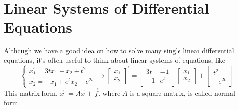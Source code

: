 \chapter{Linear Systems of Differential Equations}
Although we have a good idea on how to solve many single linear differential equations, it's often useful to think about linear systems of equations, like
\begin{equation*}
	\begin{cases}
		x_1^\prime = 3tx_1 - x_2 + t^2 \\
		x_2^\prime = -x_1 + e^tx_2 - e^{2t}
	\end{cases}
	\to
	\begin{bmatrix}
		x_1 \\ 
		x_2
	\end{bmatrix}^\prime = \begin{bmatrix}
		3t & -1 \\
		-1 & e^t
	\end{bmatrix} \begin{bmatrix}
		x_1 \\
		x_2
	\end{bmatrix} + \begin{bmatrix}
		t^2 \\
		-e^{2t}
	\end{bmatrix}
\end{equation*}
This matrix form, $\vec{x}^\prime = A\vec{x} + \vec{f}$, where $A$ is a square matrix, is called normal form.\\




